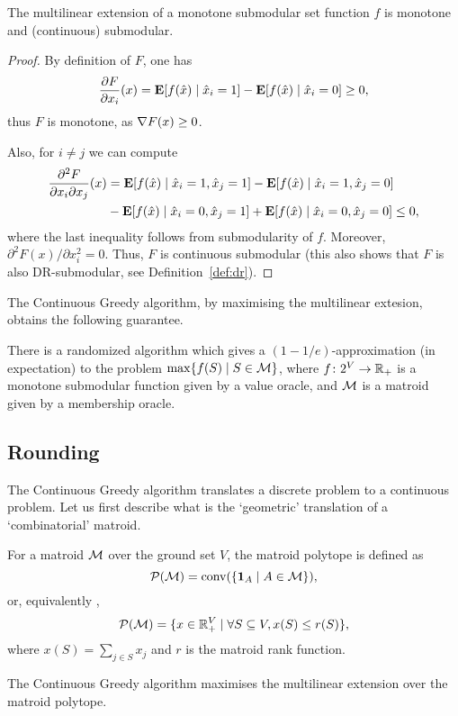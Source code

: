 \begin{lemma}\label{lem:multiproperties}
    The multilinear extension of a monotone submodular set function $f$ is monotone and (continuous) submodular.
\end{lemma}
\begin{proof}
    By definition of $F$, one has
    \[
        \frac{\partial F}{\partial x_i}(x) = \mathbf{E}[f(\hat{x})\mid \hat{x}_i = 1] - \mathbf{E}[f(\hat{x})\mid \hat{x}_i = 0] \geq 0,
    \]
    thus $F$ is monotone, as $\nabla F(x) \geq 0$.

    Also, for $i\neq j$ we can compute
    \begin{align*}
        \frac{\partial^2 F}{\partial x_i\partial x_j}(x) &= \mathbf{E}[f(\hat{x})\mid \hat{x}_i = 1, \hat{x}_j = 1] - \mathbf{E}[f(\hat{x})\mid \hat{x}_i = 1, \hat{x}_j = 0] \\
                                                         &- \mathbf{E}[f(\hat{x})\mid \hat{x}_i = 0, \hat{x}_j = 1] + \mathbf{E}[f(\hat{x})\mid \hat{x}_i = 0, \hat{x}_j = 0] 
                                                         \leq 0,
    \end{align*}
    where the last inequality follows from submodularity of $f$. Moreover, $\partial^2 F(x)/\partial x_i^2 = 0$. Thus, $F$ is continuous submodular (this also shows that $F$ is also DR-submodular, see Definition~\ref{def:dr}).
\end{proof}

The Continuous Greedy algorithm, by maximising the multilinear extesion, obtains the following guarantee.
\begin{theorem}
    There is a randomized algorithm which gives a $(1-1/e)$-approximation (in expectation) to the problem $\max\{f(S) \mid S \in \mathcal{M}\}$, where $f\colon 2^V \to \mathbb{R}_+$ is a monotone submodular function given by a value oracle, and $\mathcal{M}$ is a matroid given by a membership oracle.
\end{theorem}

\subsection{Rounding}\label{sec:rounding}
The Continuous Greedy algorithm translates a discrete problem to a continuous problem. Let us first describe what is the `geometric' translation of a `combinatorial' matroid. 

\begin{definition}
    For a matroid $\mathcal{M}$ over the ground set $V$, the matroid polytope is defined as 
    \[
        \mathcal{P}(\mathcal{M}) = \mathrm{conv}(\{\mathbf{1}_A \mid A \in \mathcal{M} \}),
    \]
    or, equivalently \citep{edmonds2003submodular},
    \[
        \mathcal{P}(\mathcal{M}) = \{ x\in \mathbb{R}^{V}_+ \mid \forall S\subseteq V, x(S) \leq r(S) \},
    \]
    where $x(S) = \sum_{j\in S}x_j$ and $r$ is the matroid rank function.
\end{definition}
The Continuous Greedy algorithm maximises the multilinear extension over the matroid polytope.

